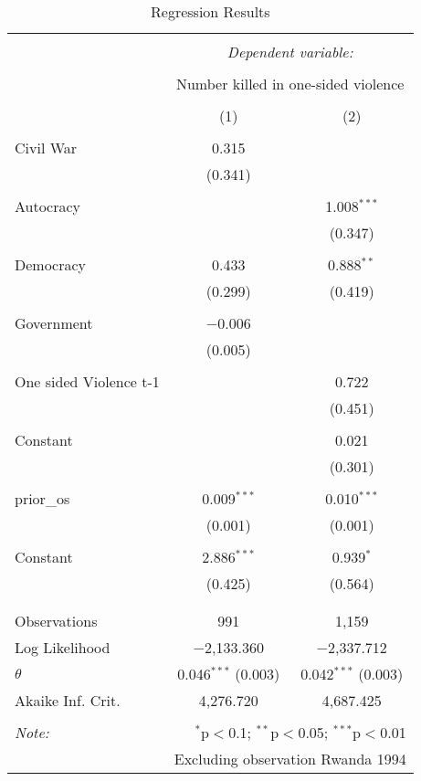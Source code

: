 
\begin{table}[!htbp] \centering 
  \caption{Regression Results} 
  \label{} 
\begin{tabular}{@{\extracolsep{5pt}}lcc} 
\\[-1.8ex]\hline 
\hline \\[-1.8ex] 
 & \multicolumn{2}{c}{\textit{Dependent variable:}} \\ 
\cline{2-3} 
\\[-1.8ex] & \multicolumn{2}{c}{Number killed in one-sided violence} \\ 
\\[-1.8ex] & (1) & (2)\\ 
\hline \\[-1.8ex] 
 Civil War & 0.315 &  \\ 
  & (0.341) &  \\ 
  & & \\ 
 Autocracy &  & 1.008$^{***}$ \\ 
  &  & (0.347) \\ 
  & & \\ 
 Democracy & 0.433 & 0.888$^{**}$ \\ 
  & (0.299) & (0.419) \\ 
  & & \\ 
 Government & $-$0.006 &  \\ 
  & (0.005) &  \\ 
  & & \\ 
 One sided Violence t-1 &  & 0.722 \\ 
  &  & (0.451) \\ 
  & & \\ 
 Constant &  & 0.021 \\ 
  &  & (0.301) \\ 
  & & \\ 
 prior\_os & 0.009$^{***}$ & 0.010$^{***}$ \\ 
  & (0.001) & (0.001) \\ 
  & & \\ 
 Constant & 2.886$^{***}$ & 0.939$^{*}$ \\ 
  & (0.425) & (0.564) \\ 
  & & \\ 
\hline \\[-1.8ex] 
Observations & 991 & 1,159 \\ 
Log Likelihood & $-$2,133.360 & $-$2,337.712 \\ 
$\theta$ & 0.046$^{***}$  (0.003) & 0.042$^{***}$  (0.003) \\ 
Akaike Inf. Crit. & 4,276.720 & 4,687.425 \\ 
\hline 
\hline \\[-1.8ex] 
\textit{Note:}  & \multicolumn{2}{r}{$^{*}$p$<$0.1; $^{**}$p$<$0.05; $^{***}$p$<$0.01} \\ 
 & \multicolumn{2}{r}{Excluding observation Rwanda 1994} \\ 
\end{tabular} 
\end{table} 
